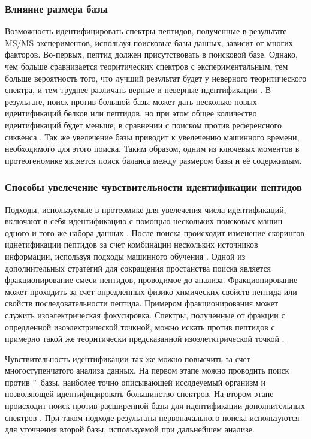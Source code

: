\subsubsection{Влияние размера базы}
Возможность идентифицировать спектры пептидов, полученные в результате MS/MS экспериментов, используя поисковые базы данных, зависит от многих факторов. Во-первых, пептид должен присутствовать в поисковой базе. Однако, чем больше сравнивается теоритических спектров с экспериментальным, тем больше вероятность того, что лучший результат будет у неверного теоритического спектра, и тем труднее различать верные и неверные идентификации \cite{nesvizhskii2010survey}. В результате, поиск против большой базы может дать несколько новых идентификаций белков или пептидов, но при этом общее количество идентификаций будет меньше, в сравнении с поиском против референсного сиквенса \cite{blakeley2012addressing, krug2013deep}. Так же увелечение базы приводит к увелечению машинного времени, необходимого для этого поиска. Таким образом, одним из ключевых моментов в протеогеномике является поиск баланса между размером базы и её содержимым.

\subsubsection{Способы увелечение чувствительности идентификации пептидов}
Подходы, используемые в протеомике для увелечения числа идентификаций, включают в себя идентификацию с помощью нескольких поисковых машин одного и того же набора данных \cite{shteynberg2013combining}. После поиска происходит изменение скорингов иднетификации пептидов за счет комбинации нескольких источников информации, используя подходы машинного обучения \cite{nesvizhskii2010survey}. Одной из дополнительных стратегий для сокращения простанства поиска является фракционирование смеси пептидов, проводимое до  анализа. Фракционирование может проходить за счет опредленных физико-химических свойств пептида или свойств последовательности пептида. Примером фракционирования может служить изоэлектрическая фокусировка. Спектры, полученные от фракции с опредленной изоэлектрической точкной, можно искать против пептидов с примерно такой же теоритически предсказанной изоэлетктрической точкой \cite{branca2014hirief}. 

Чувствительность идентификации так же можно повысчить за счет многоступенчатого анализа данных. На первом этапе можно проводить поиск против \textquotedblright\ базы, наиболее точно описывающей исслдеуемый организм и позволяющей идентифицировать большинство спектров. На втором этапе происходит поиск против расширенной базы для идентификации дополнительных спектров \cite{ning2010computational, helmy2012mass}. При таком подходе результаты первоначального поиска используются для уточнения второй базы, используемой при дальнейшем анализе. 

